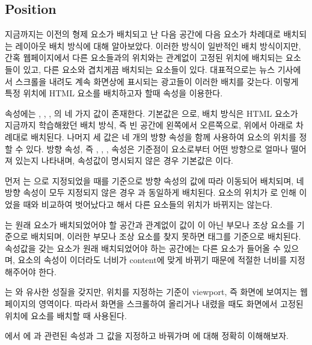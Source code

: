 \subsection*{Position}

지금까지는 이전의 형제 요소가 배치되고 난 다음 공간에 다음 요소가 차례대로 배치되는 레이아웃 배치 방식에 대해 알아보았다. 이러한 방식이 일반적인 배치 방식이지만, 간혹 웹페이지에서 다른 요소들과의 위치와는 관계없이 고정된 위치에 배치되는 요소들이 있고, 다른 요소와 겹치게끔 배치되는 요소들이 있다. 대표적으로는 뉴스 기사에서 스크롤을 내려도 계속 화면상에 표시되는 광고들이 이러한 배치를 갖는다. 이렇게 특정 위치에 HTML 요소를 배치하고자 할때  속성을 이용한다.

 속성에는 , , , 의 네 가지 값이 존재한다. 기본값은 으로,  배치 방식은 HTML 요소가 지금까지 학습해왔던 배치 방식, 즉 빈 공간에 왼쪽에서 오른쪽으로, 위에서 아래로 차례대로 배치된다. 나머지 세 값은 네 개의 방향 속성을 함께 사용하여 요소의 위치를 정할 수 있다. 방향 속성, 즉 , , ,  속성은 기준점이 요소로부터 어떤 방향으로 얼마나 떨어져 있는지 나타내며, 속성값이 명시되지 않은 경우 기본값은 이다.

먼저 는 으로 지정되었을 때를 기준으로 방향 속성의 값에 따라 이동되어 배치되며, 네 방향 속성이 모두 지정되지 않은 경우 과 동일하게 배치된다. 요소의 위치가 로 인해 이었을 때와 비교하여 벗어났다고 해서 다른 요소들의 위치가 바뀌지는 않는다.

는 원래 요소가 배치되었어야 할 공간과 관계없이  값이 이 아닌 부모나 조상 요소를 기준으로 배치되며, 이러한 부모나 조상 요소를 찾지 못하면  태그를 기준으로 배치된다.  속성값을 갖는 요소가 원래 배치되었어야 하는 공간에는 다른 요소가 들어올 수 있으며, 요소의  속성이 이더라도 너비가 content에 맞게 바뀌기 때문에 적절한 너비를 지정해주어야 한다.

는 와 유사한 성질을 갖지만, 위치를 지정하는 기준이 viewport, 즉 화면에 보여지는 웹페이지의 영역이다. 따라서 화면을 스크롤하여 올리거나 내렸을 때도 화면에서 고정된 위치에 요소를 배치할 때 사용된다.

에서 에 과 관련된 속성과 그 값을 지정하고 바꿔가며 에 대해 정확히 이해해보자.

